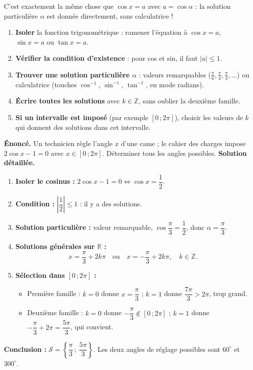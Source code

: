 \documentclass[11pt]{article}
\begin{document}
C'est exactement la même chose que $\cos x = a$ avec $a = \cos \alpha$ : la solution particulière $\alpha$ est donnée directement, sans calculatrice !

\begin{methode}
\begin{enumerate}
\item \textbf{Isoler} la fonction trigonométrique : ramener l'équation à $\cos x = a$, $\sin x = a$ ou $\tan x = a$.
\item \textbf{Vérifier la condition d'existence} : pour cos et sin, il faut $|a| \le 1$.
\item \textbf{Trouver une solution particulière $\alpha$} : valeurs remarquables ($\frac{\pi}{6}, \frac{\pi}{4}, \frac{\pi}{3}, \ldots$) ou calculatrice (touches $\cos^{-1}$, $\sin^{-1}$, $\tan^{-1}$, en mode radians).
\item \textbf{Écrire toutes les solutions} avec $k \in \mathbb{Z}$, sans oublier la deuxième famille.
\item \textbf{Si un intervalle est imposé} (par exemple $[0\,;2\pi]$), choisir les valeurs de $k$ qui donnent des solutions dans cet intervalle.
\end{enumerate}
\end{methode}

\begin{exoresolu}[{Résoudre $2\cos x - 1 = 0$ sur l'intervalle $[0\,;2\pi]$}]
\textbf{Énoncé.} Un technicien règle l'angle $x$ d'une came ; le cahier des charges impose $2\cos x - 1 = 0$ avec $x \in [0\,;2\pi]$. Déterminer tous les angles possibles.
\tcblower
\textbf{Solution détaillée.}
\begin{enumerate}
\item \textbf{Isoler le cosinus :} $2\cos x - 1 = 0 \iff \cos x = \dfrac{1}{2}$.
\item \textbf{Condition :} $\left|\dfrac{1}{2}\right| \le 1$ : il y a des solutions.
\item \textbf{Solution particulière :} valeur remarquable, $\cos \dfrac{\pi}{3} = \dfrac{1}{2}$, donc $\alpha = \dfrac{\pi}{3}$.
\item \textbf{Solutions générales sur $\mathbb{R}$ :}
\[ x = \frac{\pi}{3} + 2k\pi \quad \text{ou} \quad x = -\frac{\pi}{3} + 2k\pi, \quad k \in \mathbb{Z}. \]
\item \textbf{Sélection dans $[0\,;2\pi]$ :}
\begin{itemize}
\item Première famille : $k = 0$ donne $x = \dfrac{\pi}{3}$ ; $k = 1$ donne $\dfrac{7\pi}{3} > 2\pi$, trop grand.
\item Deuxième famille : $k = 0$ donne $-\dfrac{\pi}{3} \notin [0\,;2\pi]$ ; $k = 1$ donne $-\dfrac{\pi}{3} + 2\pi = \dfrac{5\pi}{3}$, qui convient.
\end{itemize}
\end{enumerate}
\textbf{Conclusion :} $\mathcal{S} = \left\{\dfrac{\pi}{3}\,;\ \dfrac{5\pi}{3}\right\}$. Les deux angles de réglage possibles sont $60^\circ$ et $300^\circ$.
\end{exoresolu}
\end{document}
